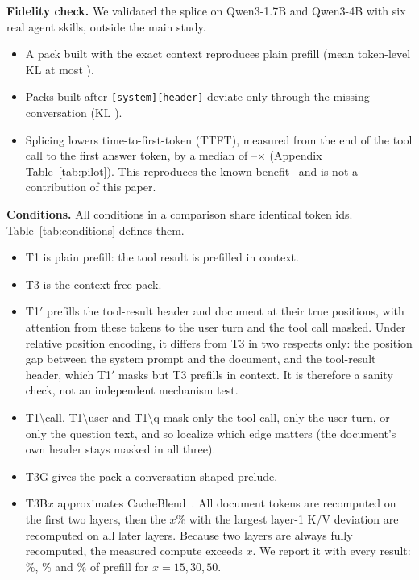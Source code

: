 \documentclass[10pt]{article}
\newcommand{\cond}[1]{\textsf{#1}}
\newcommand{\Mcall}{\cond{T1$\setminus$call}}
\newcommand{\Muser}{\cond{T1$\setminus$user}}
\newcommand{\Mq}{\cond{T1$\setminus$q}}
\begin{document}
\textbf{Fidelity check.}\label{sec:fidelity} We validated the splice on Qwen3-1.7B and Qwen3-4B with six real agent skills, outside
the main study.
\begin{itemize}
\item A pack built with the exact context reproduces plain prefill (mean token-level KL at most \PilotKLExact).
\item Packs built after \texttt{[system][header]} deviate only through the missing conversation (KL \PilotKLRange).
\item Splicing lowers time-to-first-token (TTFT), measured from the end of the tool call to the first answer token, by a median of
  \PilotSpeedupOne--\PilotSpeedupFour$\times$ (Appendix Table~\ref{tab:pilot}). This reproduces the known
  benefit~\citep{li2026notes,fang2026recache} and is not a contribution of this paper.
\end{itemize}

\textbf{Conditions.} All conditions in a comparison share identical token ids. Table~\ref{tab:conditions} defines them.
\begin{itemize}
\item \cond{T1} is plain prefill: the tool result is prefilled in context.
\item \cond{T3} is the context-free pack.
\item \cond{T1$'$} prefills the tool-result header and document at their true positions, with attention from these tokens to the user
  turn and the tool call masked. Under relative position encoding, it differs from \cond{T3} in two respects only: the position gap between the system prompt and the
  document, and the tool-result header, which \cond{T1$'$} masks but \cond{T3} prefills in context. It is therefore a sanity check,
  not an independent mechanism test.
\item \Mcall{}, \Muser{} and \Mq{} mask only the tool call, only the user turn, or only the question text, and so localize which
  edge matters (the document's own header stays masked in all three).
\item \cond{T3G} gives the pack a conversation-shaped prelude.
\item \cond{T3B$x$} approximates CacheBlend~\citep{yao2025cacheblend}. All document tokens are recomputed on the first two layers,
  then the $x\%$ with the largest layer-1 K/V deviation are recomputed on all later layers. Because two layers are always fully
  recomputed, the measured compute exceeds $x$. We report it with every result: \FracBfifteen\%, \FracBthirty\% and \FracBfifty\% of prefill
  for $x=15, 30, 50$.
\end{itemize}
\end{document}
